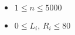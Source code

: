 \begin{itemize}
	\tightlist
	\item $1 \le n \le 5000$
	\item $0 \le L_i, \, R_i \le 80$
\end{itemize}
